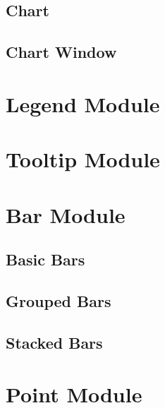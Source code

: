 
\subsection{Chart}


\subsection{Chart Window}


\section{Legend Module}

\section{Tooltip Module}

\section{Bar Module}

\subsection{Basic Bars}

\subsection{Grouped Bars}

\subsection{Stacked Bars}

\section{Point Module}